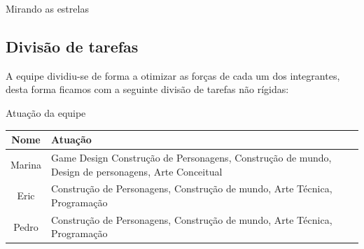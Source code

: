 Mirando as estrelas

\subsection{Divisão de tarefas}

A equipe dividiu-se de forma a
otimizar as forças de cada um dos integrantes, desta forma ficamos com a
seguinte divisão de tarefas não rígidas:

\begin{quadro}[htb] \caption{\label{quadro_atuacao}Atuação da equipe}
    \begin{tabularx}{\textwidth}{|c|X|} \hline \textbf{Nome} &
        \textbf{Atuação}\\ \hline Marina & Game Design Construção de
        Personagens, Construção de mundo, Design de personagens, Arte Conceitual
        \\ \hline Eric   & Construção de Personagens, Construção de mundo, Arte
        Técnica, Programação                                        \\ \hline
        Pedro  & Construção de Personagens, Construção de mundo, Arte Técnica,
        Programação \\ \hline \end{tabularx} 
\end{quadro}
